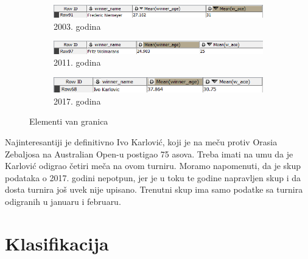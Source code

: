 \documentclass[a4paper]{article}
\begin{document}
\begin{figure}[H]
	\begin{subfigure}[h]{\textwidth}
		\begin{center}
			\includegraphics[scale=0.80]{Klasterovanje/FredericNiemeyer2003Outlier.png}
		\end{center}
		\caption{2003. godina}
		\label{fig:Autlajer2003}
	\end{subfigure}
	
	\vspace{0.5cm}
	\begin{subfigure}[h]{\textwidth}
		\begin{center}
			\includegraphics[scale=0.80]{Klasterovanje/FritzWolmarans2011Outlier.png}
		\end{center}
		\caption{2011. godina}
		\label{fig:Autlajer2011}
	\end{subfigure}
	
	\vspace{0.5cm}
	\begin{subfigure}[h]{\textwidth}
		\begin{center}
			\includegraphics[scale=0.80]{Klasterovanje/IvoKarlovic2017Outlier.png}
		\end{center}
		\caption{2017. godina}
		\label{fig:Autlajer2011}
	\end{subfigure}
	
	\caption{Elementi van granica}
	\label{fig:IgraciAutlajeri}
\end{figure} 

Najinteresantiji je definitivno Ivo Karlović, koji je na meču protiv Orasia Zebaljosa na Australian Open-u postigao 75 asova. Treba imati na umu da je Karlović odigrao četiri meča na ovom turniru. Moramo napomenuti, da je skup podataka o 2017. godini nepotpun, jer je u toku te godine napravljen skup i da dosta turnira još uvek nije upisano. Trenutni skup ima samo podatke sa turnira odigranih u januaru i februaru.  


\section{Klasifikacija}
\end{document}
